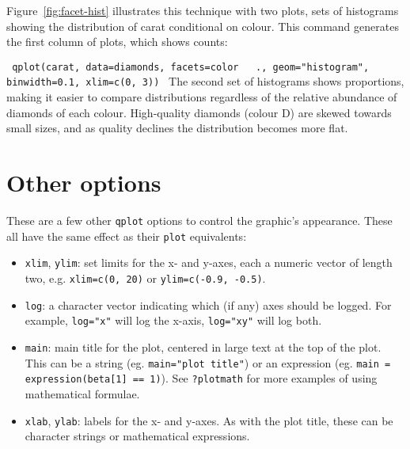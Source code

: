
Figure~\ref{fig:facet-hist} illustrates this technique with two plots, sets of histograms showing the distribution of carat conditional on colour. This command generates the first column of plots, which shows counts:

{\tt
 qplot(carat, data=diamonds, facets=color ~ ., geom="histogram", binwidth=0.1, xlim=c(0, 3))
}
%
The second set of histograms shows proportions, making it easier to compare distributions regardless of the relative abundance of diamonds of each colour. High-quality diamonds (colour D) are skewed towards small sizes, and as quality declines the distribution becomes more flat.  


% 


\section{Other options}\label{sec:other_options}

These are a few other {\tt qplot} options to control the graphic's appearance. These all have the same effect as their {\tt plot} equivalents:

\begin{itemize}
	\item {\tt xlim}, {\tt ylim}: set limits for the x- and y-axes, each a numeric vector of length two, e.g. {\tt xlim=c(0, 20)} or {\tt ylim=c(-0.9, -0.5)}.
	\item {\tt log}: a character vector indicating which (if any) axes should be logged.  For example, {\tt log="x"} will log the x-axis, {\tt log="xy"} will log both.
	\item {\tt main}: main title for the plot, centered in large text at the top of the plot.  This can be a string (eg. {\tt main="plot title"}) or an expression (eg. {\tt main = expression(beta[1] == 1)}).  See {\tt ?plotmath} for more examples of using mathematical formulae.
	\item {\tt xlab}, {\tt ylab}: labels for the x- and y-axes.  As with the plot title, these can be character strings or mathematical expressions.
\end{itemize}

